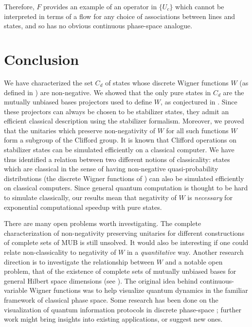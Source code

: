 \documentclass[aps,twocolumn,showpacs,nofootinbib,superscriptaddress]{revtex4}
\begin{document}
Therefore, $F$ provides an example of an operator in $\{U_c\}$ which cannot
be interpreted in terms of a flow for any choice of associations between lines
and states, and so has no obvious continuous phase-space analogue.
\medskip

\section{Conclusion} \label{secdiscussion}

We have characterized the set $C_d$ of states whose discrete
Wigner functions $W$ (as defined in \cite{GibbonsHW04}) are
non-negative. We showed that the only pure states in $C_d$ are the
mutually unbiased bases projectors used to define $W$, as
conjectured in \cite{Galvao05}. Since these projectors can always
be chosen to be stabilizer states, they admit an efficient
classical description using the stabilizer formalism. Moreover, we
proved that the unitaries which preserve non-negativity of $W$ for
all such functions $W$ form a subgroup of the Clifford group. It
is known that Clifford operations on stabilizer states can be
simulated efficiently on a classical computer. We have thus
identified a relation between two different notions of
classicality: states which are classical in the sense of having
non-negative quasi-probability distributions (the discrete Wigner
functions of \cite{GibbonsHW04}) can also be simulated efficiently
on classical computers. Since general quantum computation is
thought to be hard to simulate classically, our results mean that
negativity of $W$ is \textit{necessary} for exponential
computational speedup with pure states.

There are many open problems worth investigating. The complete
characterization of non-negativity preserving unitaries for
different constructions of complete sets of MUB is still unsolved.
It would also be interesting if one could relate non-classicality
to negativity of $W$ in a \textit{quantitative} way. Another
research direction is to investigate the relationship between $W$
and a notable open problem, that of the existence of complete sets
of mutually unbiased bases for general Hilbert space dimensions
(see \cite{Bengtsson04, BengtssonE04, Wootters04b}). The original
idea behind continuous-variable Wigner functions was to help
visualize quantum dynamics in the familiar framework of classical
phase space. Some research has been done on the visualization of
quantum information protocols in discrete phase-space
\cite{MiquelPS02,PittengerR05,Wootters04,PazRS04,KoniorczykBJ01,
Paz02, LopezP03, PazRS04b}; further work might bring insights into
existing applications, or suggest new ones.
\end{document}
